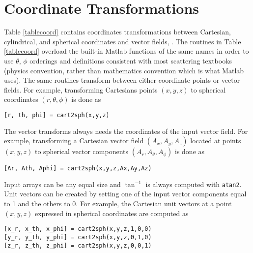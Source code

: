 
\section{Coordinate Transformations}

Table \ref{tablecoord} contains coordinates transformations between Cartesian, cylindrical, and spherical coordinates and vector fields, \cite{ulaby1999fundamentals}. The routines in Table \ref{tablecoord} overload the built-in Matlab functions of the same names in order to use $\theta$, $\phi$ orderings and definitions consistent with most scattering textbooks (physics convention, rather than mathematics convention which is what Matlab uses).  The same routines transform between either coordinate points or vector fields. For example, transforming Cartesians points $(x,y,z)$ to spherical coordinates $(r,\theta,\phi)$ is done as
\begin{verbatim}
[r, th, phi] = cart2sph(x,y,z)
\end{verbatim}

The vector transforms always needs the coordinates of the input vector field. For example, transforming a Cartesian vector field $(A_x,A_y,A_z)$ located at points $(x,y,z)$ to spherical vector components $(A_r,A_{\theta},A_{\phi})$ is done as
\begin{verbatim}
[Ar, Ath, Aphi] = cart2sph(x,y,z,Ax,Ay,Az)
\end{verbatim}

Input arrays can be any equal size and $\tan^{-1}$ is always computed with \texttt{atan2}. Unit vectors can be created by setting one of the input vector components equal to 1 and the others to 0.  For example, the Cartesian unit vectors at a point $(x,y,z)$ expressed in spherical coordinates are computed as
\begin{verbatim}
[x_r, x_th, x_phi] = cart2sph(x,y,z,1,0,0) 
[y_r, y_th, y_phi] = cart2sph(x,y,z,0,1,0)  
[z_r, z_th, z_phi] = cart2sph(x,y,z,0,0,1) 
\end{verbatim}

\clearpage
\newpage


